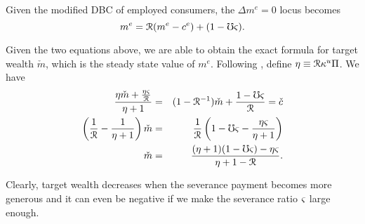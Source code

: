 Given the modified DBC of employed consumers, the $\Delta m^e=0$ locus becomes
\begin{equation}
m^e=\mathcal{R}(m^e-c^e)+(1-\mho\varsigma).
\end{equation}

Given the two equations above, we are able to obtain the exact formula for target wealth $\check{m}$, which is the steady state value of $m^e$. Following \cite{ctDiscrete}, define $\eta \equiv \mathcal{R} \kappa^{u} \Pi$. We have
\begin{eqnarray}
\frac{\eta\check{m}+\frac{\eta\varsigma}{\mathcal{R}}}{\eta+1}&=&(1-\mathcal{R}^{-1})\check{m}+\frac{1-\mho\varsigma}{\mathcal{R}}=\check{c}\nonumber\\
\left(\frac{1}{\mathcal{R}}-\frac{1}{\eta+1}\right)\check{m} &=& \frac{1}{\mathcal{R}}\left(1-\mho\varsigma-\frac{\eta\varsigma}{\eta+1}\right)\nonumber\\
\check{m}&=& \frac{(\eta+1)(1-\mho\varsigma)-\eta\varsigma}{\eta+1-\mathcal{R}}.
\end{eqnarray}

Clearly, target wealth decreases when the severance payment becomes more generous and it can even be negative if we make the severance ratio $\varsigma$ large enough.
